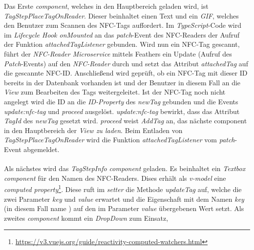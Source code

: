 \documentclass[10pt, a4paper]{article}
\begin{document}
Das Erste \textit{component}, welches in den Hauptbereich geladen wird, ist \textit{TagStepPlaceTagOnReader}. Dieser beinhaltet einen Text und ein \textit{GIF},
welches den Benutzer zum Scannen des NFC-Tags auffordert. Im \textit{TypeScript}-Code wird im \textit{Lifecycle Hook onMounted} an das \textit{patch}-Event des
NFC-Readers der Aufruf der Funktion \textit{attachedTagListener} gebunden. Wird nun ein NFC-Tag gescannt, führt der \textit{NFC-Reader Microservice} mittels Feathers ein Update (Aufruf des \textit{Patch}-Events) auf den \textit{NFC-Reader} durch und setzt das Attribut \textit{attachedTag} auf die gescannte NFC-ID.
Anschließend wird geprüft, ob ein NFC-Tag mit dieser ID bereits in der Datenbank vorhanden ist und der Benutzer in diesem Fall an die \textit{View} zum Bearbeiten des Tags weitergeleitet. Ist der NFC-Tag noch nicht angelegt wird die ID an die \textit{ID-Property} des \textit{newTag} gebunden und die Events \textit{update:nfc-tag} und \textit{proceed} ausgelöst. \textit{update:nfc-tag} bewirkt, dass das Attribut \textit{TagId} des \textit{newTag} gesetzt wird. \textit{proceed} weist \textit{AddTag} an, das nächste component in den Hauptbereich der \textit{View zu laden}. Beim Entladen von \textit{TagStepPlaceTagOnReader} wird die Funktion \textit{attachedTagListener} vom \textit{patch}-Event abgemeldet.
\\~\\
Als nächstes wird das \textit{TagStepInfo component} geladen. Es beinhaltet ein \textit{Textbox component} für den Namen des NFC-Readers. Dises erhält als \textit{v-model} eine \textit{computed property}\footnote{\url{https://v3.vuejs.org/guide/reactivity-computed-watchers.html}}. Diese ruft im \textit{setter} die Methode \textit{updateTag} auf, welche die zwei Parameter \textit{key} und \textit{value} erwartet und die Eigenschaft mit dem Namen \textit{key} (in diesem Fall \glqq name \grqq{}) auf den im Parameter \textit{value} übergebenen Wert setzt. Als zweites \textit{component} kommt ein  \textit{DropDown} zum Einsatz,
\end{document}
